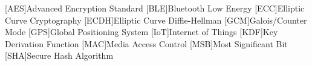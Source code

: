 \begin{acronym}[AAAAA]

    [AES]{Advanced Encryption Standard}
    [BLE]{Bluetooth Low Energy}
    [ECC]{Elliptic Curve Cryptography}
    [ECDH]{Elliptic Curve Diffie-Hellman}
    [GCM]{Galois/Counter Mode}
    [GPS]{Global Positioning System}
    [IoT]{Internet of Things}
    [KDF]{Key Derivation Function}
    [MAC]{Media Access Control}
    [MSB]{Most Significant Bit}
    [SHA]{Secure Hash Algorithm}
    
\end{acronym}